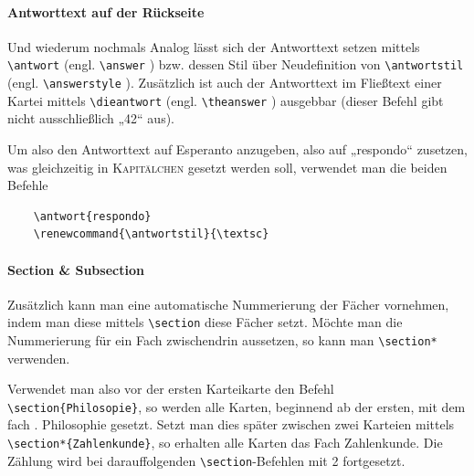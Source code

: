\documentclass[a4paper]{article}
\begin{document}
\paragraph{Antworttext auf der Rückseite}\label{par:Antwort} Und wiederum nochmals Analog lässt sich der Antworttext setzen mittels \lstinline!\antwort! (engl. \lstinline!\answer! ) bzw. dessen Stil über Neudefinition von \lstinline!\antwortstil! (engl. \lstinline!\answerstyle! ). Zusätzlich ist auch der Antworttext im Fließtext einer Kartei mittels \lstinline!\dieantwort! (engl. \lstinline!\theanswer! ) ausgebbar (dieser Befehl gibt nicht ausschließlich „42“ aus).

Um also den Antworttext auf Esperanto anzugeben, also auf „respondo“ zusetzen, was gleichzeitig in \textsc{Kapitälchen} gesetzt werden soll, verwendet man die beiden Befehle
\begin{lstlisting}
	\antwort{respondo}
	\renewcommand{\antwortstil}{\textsc}
\end{lstlisting}

\paragraph{Section \& Subsection} Zusätzlich kann man eine automatische Nummerierung der Fächer vornehmen, indem man diese mittels \lstinline!\section!  diese Fächer setzt. Möchte man die Nummerierung für ein Fach zwischendrin aussetzen, so kann man \lstinline!\section*! verwenden.

Verwendet man also vor der ersten Karteikarte den Befehl \lstinline!\section{Philosopie}!, so werden alle Karten, beginnend ab der ersten, mit dem fach {. Philosophie} gesetzt. Setzt man dies später zwischen zwei Karteien mittels \lstinline!\section*{Zahlenkunde}!, so erhalten alle Karten das Fach {\sffamily Zahlenkunde}. Die Zählung wird bei darauffolgenden \lstinline!\section!-Befehlen mit 2 fortgesetzt.
\end{document}
